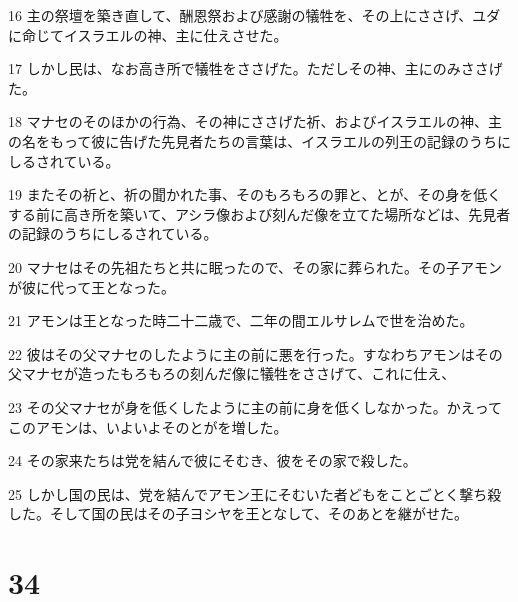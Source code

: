 \par 16 主の祭壇を築き直して、酬恩祭および感謝の犠牲を、その上にささげ、ユダに命じてイスラエルの神、主に仕えさせた。
\par 17 しかし民は、なお高き所で犠牲をささげた。ただしその神、主にのみささげた。
\par 18 マナセのそのほかの行為、その神にささげた祈、およびイスラエルの神、主の名をもって彼に告げた先見者たちの言葉は、イスラエルの列王の記録のうちにしるされている。
\par 19 またその祈と、祈の聞かれた事、そのもろもろの罪と、とが、その身を低くする前に高き所を築いて、アシラ像および刻んだ像を立てた場所などは、先見者の記録のうちにしるされている。
\par 20 マナセはその先祖たちと共に眠ったので、その家に葬られた。その子アモンが彼に代って王となった。
\par 21 アモンは王となった時二十二歳で、二年の間エルサレムで世を治めた。
\par 22 彼はその父マナセのしたように主の前に悪を行った。すなわちアモンはその父マナセが造ったもろもろの刻んだ像に犠牲をささげて、これに仕え、
\par 23 その父マナセが身を低くしたように主の前に身を低くしなかった。かえってこのアモンは、いよいよそのとがを増した。
\par 24 その家来たちは党を結んで彼にそむき、彼をその家で殺した。
\par 25 しかし国の民は、党を結んでアモン王にそむいた者どもをことごとく撃ち殺した。そして国の民はその子ヨシヤを王となして、そのあとを継がせた。

\chapter{34}

